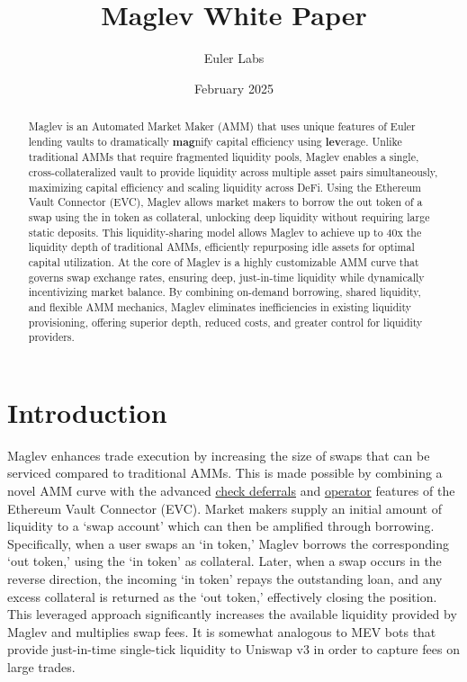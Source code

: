 \documentclass{article}
\title{Maglev White Paper}
\author{Euler Labs}  %
\date{February 2025}
\begin{document}
\maketitle

\begin{abstract}    
    Maglev is an Automated Market Maker (AMM) that uses unique features of Euler lending vaults to dramatically \textbf{mag}nify capital efficiency using \textbf{lev}erage. Unlike traditional AMMs that require fragmented liquidity pools, Maglev enables a single, cross-collateralized vault to provide liquidity across multiple asset pairs simultaneously, maximizing capital efficiency and scaling liquidity across DeFi. Using the Ethereum Vault Connector (EVC), Maglev allows market makers to borrow the out token of a swap using the in token as collateral, unlocking deep liquidity without requiring large static deposits. This liquidity-sharing model allows Maglev to achieve up to 40x the liquidity depth of traditional AMMs, efficiently repurposing idle assets for optimal capital utilization. At the core of Maglev is a highly customizable AMM curve that governs swap exchange rates, ensuring deep, just-in-time liquidity while dynamically incentivizing market balance. By combining on-demand borrowing, shared liquidity, and flexible AMM mechanics, Maglev eliminates inefficiencies in existing liquidity provisioning, offering superior depth, reduced costs, and greater control for liquidity providers.
\end{abstract}

\section{Introduction}

Maglev enhances trade execution by increasing the size of swaps that can be serviced compared to traditional AMMs. This is made possible by combining a novel AMM curve with the advanced \href{https://docs.euler.finance/developers/evc/keyConcepts?_highlight=operator#batch-operations}{check deferrals} and \href{https://docs.euler.finance/developers/evc/keyConcepts?_highlight=operator#operators}{operator} features of the Ethereum Vault Connector (EVC). Market makers supply an initial amount of liquidity to a `swap account' which can then be amplified through borrowing. Specifically, when a user swaps an `in token,' Maglev borrows the corresponding `out token,' using the `in token' as collateral. Later, when a swap occurs in the reverse direction, the incoming `in token' repays the outstanding loan, and any excess collateral is returned as the `out token,' effectively closing the position. This leveraged approach significantly increases the available liquidity provided by Maglev and multiplies swap fees. It is somewhat analogous to MEV bots that provide just-in-time single-tick liquidity to Uniswap v3 in order to capture fees on large trades.
\end{document}

